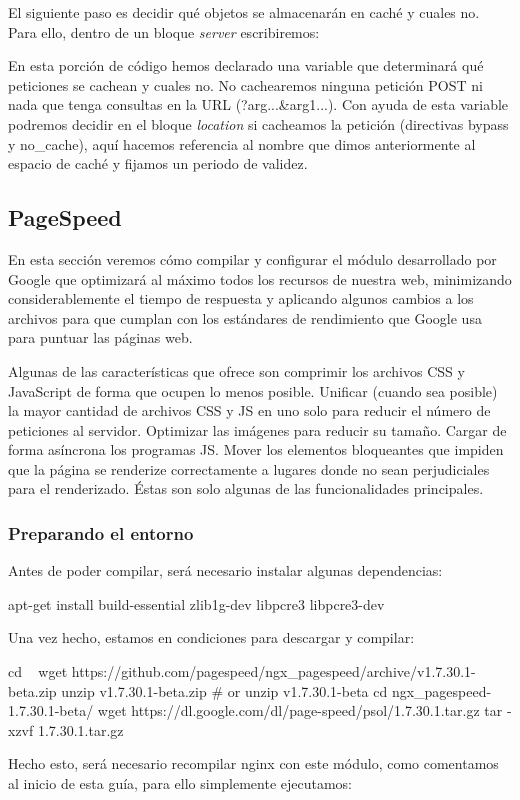 El siguiente paso es decidir qué objetos se almacenarán en caché y cuales no.
Para ello, dentro de un bloque \emph{server} escribiremos:
En esta porción de código hemos declarado una variable que determinará qué
peticiones se cachean y cuales no. No cachearemos ninguna petición POST ni
nada que tenga consultas en la URL (?arg...\&arg1...). Con ayuda de esta variable
podremos decidir en el bloque \emph{location} si cacheamos la petición (directivas
bypass y no\_cache), aquí hacemos referencia al nombre que dimos anteriormente
al espacio de caché y fijamos un periodo de validez.
\subsection{PageSpeed}
En esta sección veremos cómo compilar y configurar el módulo desarrollado
por Google que optimizará al máximo todos los recursos de nuestra web, minimizando
considerablemente el tiempo de respuesta y aplicando algunos cambios a los
archivos para que cumplan con los estándares de rendimiento que Google usa
para puntuar las páginas web.

Algunas de las características que  ofrece son comprimir los archivos CSS y
JavaScript de forma que ocupen lo menos posible. Unificar (cuando sea posible)
la mayor cantidad de archivos CSS y JS en uno solo para reducir el número
de peticiones al servidor. Optimizar las imágenes para reducir su tamaño. Cargar
de forma asíncrona los programas JS. Mover los elementos bloqueantes que impiden
que la página se renderize correctamente a lugares donde no sean perjudiciales
para el renderizado. Éstas son solo algunas de las funcionalidades principales.

\subsubsection{Preparando el entorno}
Antes de poder compilar, será necesario instalar algunas dependencias:
\begin{bashcode}
apt-get install build-essential zlib1g-dev libpcre3 libpcre3-dev
\end{bashcode}
Una vez hecho, estamos en condiciones para descargar y compilar:
\begin{bashcode}
cd ~
wget https://github.com/pagespeed/ngx_pagespeed/archive/v1.7.30.1-beta.zip
unzip v1.7.30.1-beta.zip # or unzip v1.7.30.1-beta
cd ngx_pagespeed-1.7.30.1-beta/
wget https://dl.google.com/dl/page-speed/psol/1.7.30.1.tar.gz
tar -xzvf 1.7.30.1.tar.gz
\end{bashcode}
Hecho esto, será necesario recompilar nginx con este módulo, como comentamos
al inicio de esta guía, para ello simplemente ejecutamos:
